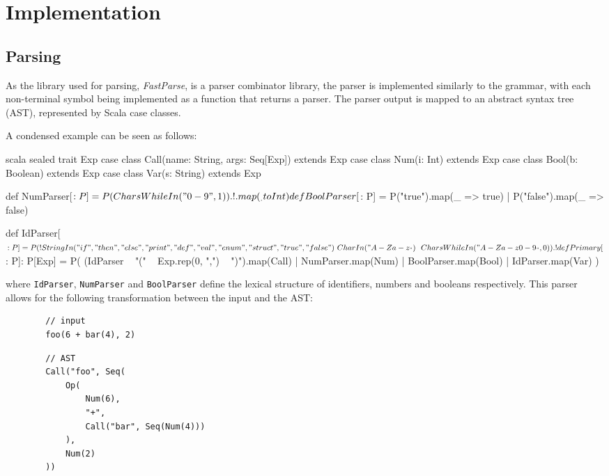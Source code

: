 \chapter{Implementation}

\section{Parsing}

As the library used for parsing, \emph{FastParse}, is a parser combinator library, the parser is
implemented similarly to the grammar, with each non-terminal symbol being implemented as a function
that returns a parser. The parser output is mapped to an abstract syntax tree (AST), represented by
Scala case classes.

A condensed example can be seen as follows:

\begin{code}{scala}
    sealed trait Exp
    case class Call(name: String, args: Seq[Exp]) extends Exp
    case class Num(i: Int) extends Exp
    case class Bool(b: Boolean) extends Exp
    case class Var(s: String) extends Exp

    def NumParser[$: P] =
        P(CharsWhileIn("0-9", 1)).!.map(_.toInt)

    def BoolParser[$: P] =
        P("true").map(_ => true) |
        P("false").map(_ => false)

    def IdParser[$: P] = P(
        !StringIn("if", "then", "else", "print", "def", "val", "enum", "struct", "true", "false")
        ~ CharIn("A-Za-z_") ~~ CharsWhileIn("A-Za-z0-9_", 0)
    ).!

    def Primary[$: P]: P[Exp] = P(
        (IdParser ~ "(" ~ Exp.rep(0, ",") ~ ")").map(Call) |
        NumParser.map(Num) |
        BoolParser.map(Bool) |
        IdParser.map(Var)
    )
\end{code}

\noindent where \texttt{IdParser}, \texttt{NumParser} and \texttt{BoolParser} define the lexical
structure of identifiers, numbers and booleans respectively. This parser allows for the following
transformation between the input and the AST:

\begin{tcolorbox}
    \begin{verbatim}
        // input
        foo(6 + bar(4), 2)
    \end{verbatim}
    \tcblower
    \begin{verbatim}
        // AST
        Call("foo", Seq(
            Op(
                Num(6),
                "+",
                Call("bar", Seq(Num(4)))
            ),
            Num(2)
        ))
    \end{verbatim}
\end{tcolorbox}

